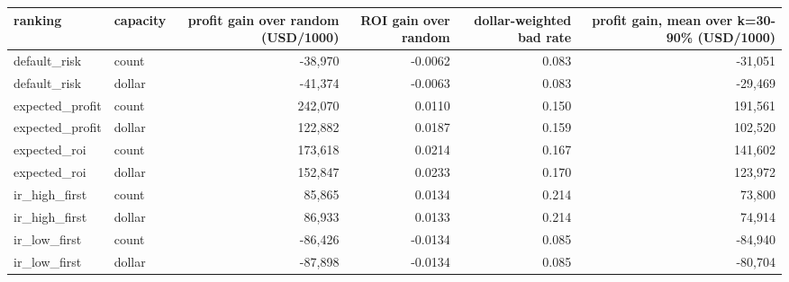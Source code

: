 \begin{tabular}{llrrrr}
\toprule
ranking & capacity & profit gain over random (USD/1000) & ROI gain over random & dollar-weighted bad rate & profit gain, mean over k=30-90\% (USD/1000) \\
\midrule
default\_risk & count & -38,970 & -0.0062 & 0.083 & -31,051 \\
default\_risk & dollar & -41,374 & -0.0063 & 0.083 & -29,469 \\
expected\_profit & count & 242,070 & 0.0110 & 0.150 & 191,561 \\
expected\_profit & dollar & 122,882 & 0.0187 & 0.159 & 102,520 \\
expected\_roi & count & 173,618 & 0.0214 & 0.167 & 141,602 \\
expected\_roi & dollar & 152,847 & 0.0233 & 0.170 & 123,972 \\
ir\_high\_first & count & 85,865 & 0.0134 & 0.214 & 73,800 \\
ir\_high\_first & dollar & 86,933 & 0.0133 & 0.214 & 74,914 \\
ir\_low\_first & count & -86,426 & -0.0134 & 0.085 & -84,940 \\
ir\_low\_first & dollar & -87,898 & -0.0134 & 0.085 & -80,704 \\
\bottomrule
\end{tabular}
